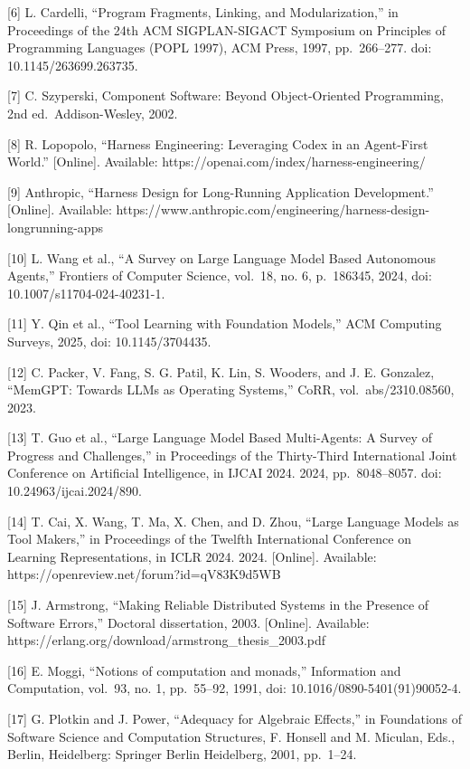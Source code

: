\documentclass[
  10
]{article}
\begin{document}
{[}6{]} L. Cardelli, ``Program Fragments, Linking, and Modularization,'' in Proceedings
of the 24th ACM SIGPLAN-SIGACT Symposium on Principles of Programming Languages
(POPL 1997), ACM Press, 1997, pp.~266--277. doi: 10.1145/263699.263735.

{[}7{]} C. Szyperski, Component Software: Beyond Object-Oriented Programming, 2nd
ed.~Addison-Wesley, 2002.

{[}8{]} R. Lopopolo, ``Harness Engineering: Leveraging Codex in an Agent-First
World.'' {[}Online{]}. Available: https://openai.com/index/harness-engineering/

{[}9{]} Anthropic, ``Harness Design for Long-Running Application Development.''
{[}Online{]}. Available: https://www.anthropic.com/engineering/harness-design-longrunning-apps

{[}10{]} L. Wang et al., ``A Survey on Large Language Model Based Autonomous
Agents,'' Frontiers of Computer Science, vol.~18, no. 6, p.~186345, 2024, doi:
10.1007/s11704-024-40231-1.

{[}11{]} Y. Qin et al., ``Tool Learning with Foundation Models,'' ACM Computing
Surveys, 2025, doi: 10.1145/3704435.

{[}12{]} C. Packer, V. Fang, S. G. Patil, K. Lin, S. Wooders, and J. E. Gonzalez,
``MemGPT: Towards LLMs as Operating Systems,'' CoRR, vol.~abs/2310.08560, 2023.

{[}13{]} T. Guo et al., ``Large Language Model Based Multi-Agents: A Survey of
Progress and Challenges,'' in Proceedings of the Thirty-Third International Joint
Conference on Artificial Intelligence, in IJCAI 2024. 2024, pp.~8048--8057. doi:
10.24963/ijcai.2024/890.

{[}14{]} T. Cai, X. Wang, T. Ma, X. Chen, and D. Zhou, ``Large Language Models as
Tool Makers,'' in Proceedings of the Twelfth International Conference on Learning
Representations, in ICLR 2024. 2024. {[}Online{]}. Available:
https://openreview.net/forum?id=qV83K9d5WB

{[}15{]} J. Armstrong, ``Making Reliable Distributed Systems in the Presence of
Software Errors,'' Doctoral dissertation, 2003. {[}Online{]}. Available:
https://erlang.org/download/armstrong\_thesis\_2003.pdf

{[}16{]} E. Moggi, ``Notions of computation and monads,'' Information and
Computation, vol.~93, no. 1, pp.~55--92, 1991, doi: 10.1016/0890-5401(91)90052-4.

{[}17{]} G. Plotkin and J. Power, ``Adequacy for Algebraic Effects,'' in Foundations of
Software Science and Computation Structures, F. Honsell and M. Miculan, Eds.,
Berlin, Heidelberg: Springer Berlin Heidelberg, 2001, pp.~1--24.
\end{document}
